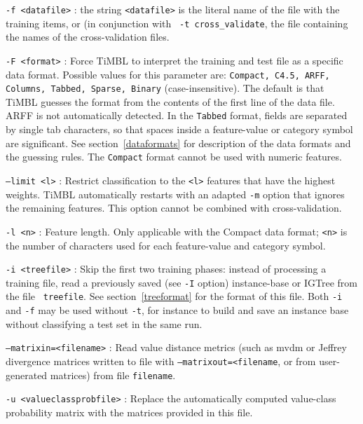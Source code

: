 \documentclass{book}
\begin{document}
\begin{description}

\item {\tt -f <datafile>} : the string {\tt <datafile>} is the literal
name of the file with the training items, or (in conjunction with {\tt
-t cross\_validate}, the file containing the names of the
cross-validation files.

\item {\tt -F <format>} : Force TiMBL to interpret the training and
test file as a specific data format. Possible values for this
parameter are: {\tt Compact, C4.5, ARFF, Columns, Tabbed, Sparse,
  Binary} (case-insensitive). The default is that TiMBL guesses the
format from the contents of the first line of the data file. ARFF is
not automatically detected. In the {\tt Tabbed} format, fields are
separated by single tab characters, so that spaces inside a
feature-value or category symbol are significant. See
section~\ref{dataformats} for description of the data formats and the
guessing rules. The {\tt Compact} format cannot be used with numeric
features.

\item {\tt --limit <l>} : Restrict classification to the {\tt <l>}
  features that have the highest weights. TiMBL automatically restarts
  with an adapted {\tt -m} option that ignores the remaining
  features. This option cannot be combined with cross-validation.

\item {\tt -l <n>} : Feature length. Only applicable with the Compact
  data format; {\tt <n>} is the number of characters used for each
  feature-value and category symbol.

\item {\tt -i <treefile>} : Skip the first two training phases:
  instead of processing a training file, read a previously saved (see
  {\tt -I} option) instance-base or {\sc IGTree} from the file {\tt
    treefile}. See section~\ref{treeformat} for the format of this
  file. Both {\tt -i} and {\tt -f} may be used without {\tt -t}, for
  instance to build and save an instance base without classifying a
  test set in the same run.

\item {\tt --matrixin=<filename>} : Read value distance metrics (such
  as {\sc mvdm} or Jeffrey divergence matrices written to file with
  {\tt --matrixout=<filename}, or from user-generated matrices) from
  file {\tt filename}.

\item {\tt -u <valueclassprobfile>} : Replace the automatically
  computed value-class probability matrix with the matrices provided
  in this file.


\end{description}
\end{document}
